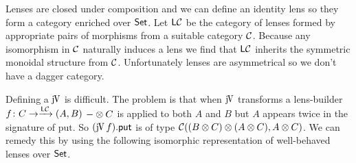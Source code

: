 \documentclass[runningheads,envcountsame]{llncs}
\begin{document}
    Lenses are closed under composition and we can define an identity lens so they form a category enriched over $\mathsf{Set}$. Let ${\mathsf{L}\mathcal{C}}$ be the category of lenses formed by appropriate pairs of morphisms from a suitable category $\mathcal{C}$. Because any isomorphism in $\mathcal{C}$ naturally induces a lens we find that ${\mathsf{L}\mathcal{C}}$ inherits the symmetric monoidal structure from $\mathcal{C}$. Unfortunately lenses are asymmetrical so we don't have a dagger category. 
    
    Defining a $\juncurry$ is difficult. The problem is that when $\juncurry$ transforms a lens-builder $f\colon C \to \xrightarrow{{\mathsf{L}\mathcal{C}}}(A, B)$ $\tensor{-}{C}$ is applied to both $A$ and $B$ but $A$ appears twice in the signature of $\mathrm{put}$. So $\lput{(\juncurry\,f)}$ is of type $\homC{\tensor{(\tensor{B}{C})}{(\tensor{A}{C})}}{\tensor{A}{C}}$. We can remedy this by using the following isomorphic representation of well-behaved lenses over $\mathsf{Set}$.
    
\end{document}
